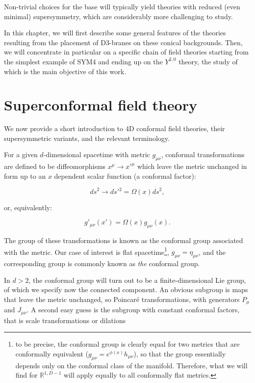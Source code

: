 Non-trivial choices for the base will typically yield theories with reduced (even minimal) supersymmetry, which are considerably more challenging to study.

In this chapter, we will first describe some general features of the theories resulting from the placement of D3-branes on these conical backgrounds. Then, we will concentrate in particular on a specific chain of field theories starting from the simplest example of SYM4 and ending up on the $Y^{2,0}$ theory, the study of which is the main objective of this work.

\section{Superconformal field theory}

We now provide a short introduction to 4D conformal field theories, their supersymmetric variants, and the relevant terminology.

For a given $d$-dimensional spacetime with metric $g_{\mu\nu}$, conformal transformations are defined to be diffeomorphisms $x^\mu \rightarrow x'^\mu$ which leave the metric unchanged in form up to an $x$ dependent scalar function (a conformal factor):

\begin{equation}
	ds^2 \rightarrow ds'{}^2 = \Omega(x) ds^2,
	\label{}
\end{equation}

or, equivalently:

\begin{equation}
	g'_{\mu\nu}(x') = \Omega(x) g_{\mu\nu}(x).
	\label{}
\end{equation}

The group of these transformations is known as the conformal group associated with the metric. Our case of interest is flat spacetime\footnote{to be precise, the conformal group is clearly equal for two metrics that are conformally equivalent ($g_{\mu\nu} = e^{\phi(x)} h_{\mu\nu}$), so that the group essentially depends only on the conformal class of the manifold. Therefore, what we will find for $\mathbb{R}^{1,D-1}$ will apply equally to all conformally flat metrics.}, $g_{\mu\nu} = \eta_{\mu\nu}$, and the corresponding group is commonly known as \emph{the} conformal group.

In $d>2$, the conformal group will turn out to be a finite-dimensional Lie group, of which we specify now the connected component. An obvious subgroup is maps that leave the metric unchanged, so Poincar\'e transformations, with generators $P_\mu$ and $J_{\mu\nu}$. A second easy guess is the subgroup with constant conformal factors, that is scale transformations or dilations

